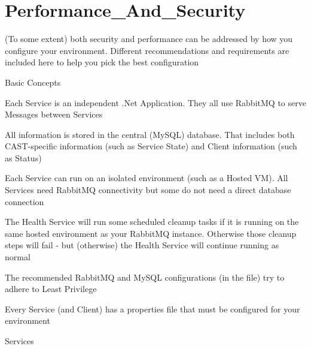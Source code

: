 \chapter{Performance\+\_\+\+And\+\_\+\+Security }
\hypertarget{md__execution___u_i_2_execution___u_i_2wwwroot_2server_2_performance___and___security}{}\label{md__execution___u_i_2_execution___u_i_2wwwroot_2server_2_performance___and___security}
(To some extent) both security and performance can be addressed by how you configure your environment. Different recommendations and requirements are included here to help you pick the best configuration

Basic Concepts


\begin{DoxyEnumerate}
\item Each Service is an independent .Net Application. They all use Rabbit\+MQ to serve Messages between Services
\item All information is stored in the central (My\+SQL) database. That includes both CAST-\/specific information (such as Service State) and Client information (such as Status)
\item Each Service can run on an isolated environment (such as a Hosted VM). All Services need Rabbit\+MQ connectivity but some do not need a direct database connection
\item The Health Service will run some scheduled cleanup tasks if it is running on the same hosted environment as your Rabbit\+MQ instance. Otherwise those cleanup steps will fail -\/ but (otherwise) the Health Service will continue running as normal
\item The recommended Rabbit\+MQ and My\+SQL configurations (in the  file) try to adhere to Least Privilege
\item Every Service (and Client) has a properties file that must be configured for your environment
\end{DoxyEnumerate}

Services


